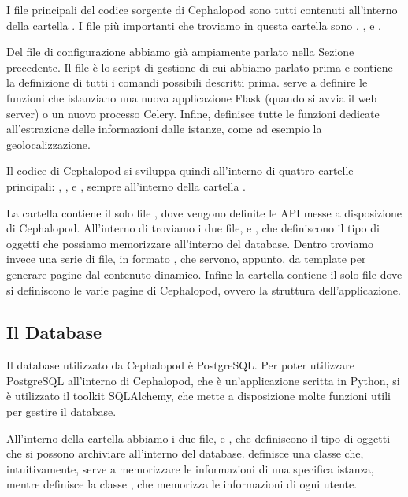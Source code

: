             I file principali del codice sorgente di Cephalopod sono tutti contenuti all'interno della cartella . I file più importanti che troviamo in questa cartella sono , ,  e .
            
            Del file di configurazione  abbiamo già ampiamente parlato nella Sezione precedente. Il file  è lo script di gestione di cui abbiamo parlato prima e contiene la definizione di tutti i comandi possibili descritti prima.  serve a definire le funzioni che istanziano una nuova applicazione Flask (quando si avvia il web server) o un nuovo processo Celery. Infine,  definisce tutte le funzioni dedicate all'estrazione delle informazioni dalle istanze, come ad esempio la geolocalizzazione.
            
            Il codice di Cephalopod si sviluppa quindi all'interno di quattro cartelle principali: , ,  e , sempre all'interno della cartella .
            
            La cartella  contiene il solo file , dove vengono definite le \ac{API} messe a disposizione di Cephalopod. All'interno di  troviamo i due file,  e , che definiscono il tipo di oggetti che possiamo memorizzare all'interno del database. Dentro  troviamo invece una serie di file, in formato , che servono, appunto, da template per generare pagine dal contenuto dinamico. Infine la cartella  contiene il solo file  dove si definiscono le varie pagine di Cephalopod, ovvero la struttura dell'applicazione.
            
        \subsection{Il Database} \label{subsec:it;di;database}
        
            Il database utilizzato da Cephalopod è PostgreSQL. Per poter utilizzare PostgreSQL all'interno di Cephalopod, che è un'applicazione scritta in Python, si è utilizzato il toolkit SQLAlchemy, che mette a disposizione molte funzioni utili per gestire il database.
            
            All'interno della cartella  abbiamo i due file,  e , che definiscono il tipo di oggetti che si possono archiviare all'interno del database.  definisce una classe  che, intuitivamente, serve a memorizzare le informazioni di una specifica istanza, mentre  definisce la classe , che memorizza le informazioni di ogni utente.
            
